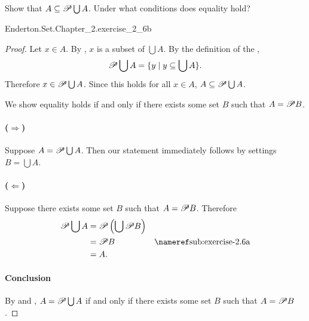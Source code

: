 \documentclass{report}
\begin{document}
\subsection{}%

  Show that $A \subseteq \mathscr{P}\bigcup A$.
  Under what conditions does equality hold?

    {Enderton.Set.Chapter\_2.exercise\_2\_6b}

  \begin{proof}

    Let $x \in A$.
    By , $x$ is a subset of $\bigcup A$.
    By the definition of the ,
      $$\mathscr{P}\bigcup A = \{ y \mid y \subseteq \bigcup A \}.$$
    Therefore $x \in \mathscr{P}\bigcup A$.
    Since this holds for all $x \in A$, $A \subseteq \mathscr{P}\bigcup A$.

    \suitdivider

    We show equality holds if and only if there exists some set $B$ such that
      $A = \mathscr{P}B$.

    \paragraph{($\Rightarrow$)}%

      Suppose $A = \mathscr{P}\bigcup A$.
      Then our statement immediately follows by settings $B = \bigcup A$.

    \paragraph{($\Leftarrow$)}%

      Suppose there exists some set $B$ such that $A = \mathscr{P}B$.
      Therefore
        \begin{align*}
          \powerset{\bigcup A}
            & = \powerset{\left(\bigcup {\powerset {B}}\right)} \\
            & = \powerset{B} & \textref{sub:exercise-2.6a} \\
            & = A.
        \end{align*}

    \paragraph{Conclusion}%

      By  and ,
        $A = \mathscr{P}\bigcup A$ if and only if there exists some set $B$ such
        that $A = \mathscr{P}B$.

  \end{proof}
\end{document}
